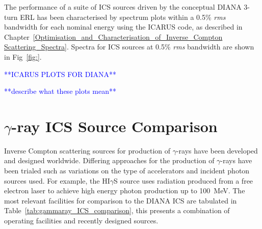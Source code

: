 \documentclass[../main.tex]{subfiles}
\begin{document}
The performance of a suite of ICS sources driven by the conceptual DIANA 3-turn ERL has been characterised by spectrum plots within a 0.5\% \textit{rms} bandwidth for each nominal energy using the ICARUS code, as described in Chapter~\ref{Optimisation_and_Characterisation_of_Inverse_Compton Scattering_Spectra}. Spectra for ICS sources at 0.5\% \textit{rms} bandwidth are shown in Fig~\ref{fig:}.

\textcolor{blue}{**ICARUS PLOTS FOR DIANA**}

\textcolor{blue}{**describe what these plots mean**}

\section{$\gamma$-ray ICS Source Comparison}
\label{sec:gamma_ICS_comparison}

Inverse Compton scattering sources for production of $\gamma$-rays have been developed and designed worldwide. Differing approaches for the production of $\gamma$-rays have been trialed such as variations on the type of accelerators and incident photon sources used. For example, the HI$\gamma$S source uses radiation produced from a free electron laser to achieve high energy photon production up to 100~\si{\mega\electronvolt}. The most relevant facilities for comparison to the DIANA ICS are tabulated in Table~\ref{tab:gammaray_ICS_comparison}, this presents a combination of operating facilities and recently designed sources. 
\end{document}
